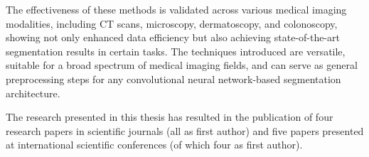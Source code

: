 The effectiveness of these methods is validated across various medical imaging modalities, including CT scans, microscopy, dermatoscopy, and colonoscopy, showing not only enhanced data efficiency but also achieving state-of-the-art segmentation results in certain tasks. The techniques introduced are versatile, suitable for a broad spectrum of medical imaging fields, and can serve as general preprocessing steps for any convolutional neural network-based segmentation architecture.

The research presented in this thesis has resulted in the publication of four research papers in scientific journals (all as first author) and five papers presented at international scientific conferences (of which four as first author). 